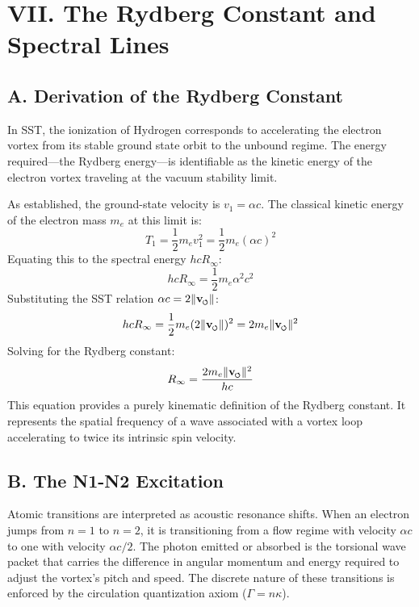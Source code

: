 \documentclass[11pt]{article}
\newcommand{\vswirl}{\mathbf{v}_{\mkern-2mu\scriptscriptstyle\boldsymbol{\circlearrowleft}}}
\begin{document}
\section*{VII. The Rydberg Constant and Spectral Lines}
\subsection*{A. Derivation of the Rydberg Constant}
In SST, the ionization of Hydrogen corresponds to accelerating the electron vortex from its stable ground state orbit to the unbound regime. The energy required—the Rydberg energy—is identifiable as the kinetic energy of the electron vortex traveling at the vacuum stability limit.

As established, the ground-state velocity is $v_1 = \alpha c$. The classical kinetic energy of the electron mass $m_e$ at this limit is:
\begin{equation}
T_1 = \frac{1}{2} m_e v_1^2 = \frac{1}{2} m_e (\alpha c)^2
\end{equation}
Equating this to the spectral energy $hcR_\infty$:
\begin{equation}
hcR_\infty = \frac{1}{2} m_e \alpha^2 c^2
\end{equation}
Substituting the SST relation $\alpha c = 2 \|\vswirl\|$:
\begin{equation}
hcR_\infty = \frac{1}{2} m_e (2 \|\vswirl\|)^2 = 2 m_e \|\vswirl\|^2
\end{equation}
Solving for the Rydberg constant:
\begin{equation}
R_\infty = \frac{2 m_e \|\vswirl\|^2}{hc}
\end{equation}
This equation provides a purely kinematic definition of the Rydberg constant. It represents the spatial frequency of a wave associated with a vortex loop accelerating to twice its intrinsic spin velocity.

\subsection*{B. The N1-N2 Excitation}
Atomic transitions are interpreted as acoustic resonance shifts. When an electron jumps from $n=1$ to $n=2$, it is transitioning from a flow regime with velocity $\alpha c$ to one with velocity $\alpha c / 2$. The photon emitted or absorbed is the torsional wave packet that carries the difference in angular momentum and energy required to adjust the vortex's pitch and speed. The discrete nature of these transitions is enforced by the circulation quantization axiom ($\Gamma = n \kappa$).
\end{document}
